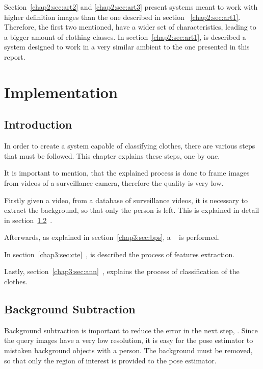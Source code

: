 \documentclass[titlepage,12pt,a4paper,times]{book}
\begin{document}
Section~\ref{chap2:sec:art2} and \ref{chap2:sec:art3} present systems meant to
work with higher definition images than the one described in section
~\ref{chap2:sec:art1}. Therefore, the first two mentioned, have a wider set of
characteristics, leading to a bigger amount of clothing classes. In
section~\ref{chap2:sec:art1}, is described a system designed to work in a very
similar ambient to the one presented in this report.

\chapter{Implementation}
\label{chap:imp}

\section{Introduction}
\label{chap3:sec:intro}

In order to create a system capable of classifying clothes, there are various
steps that must be followed. This chapter explains these steps, one by one.

It is important to mention, that the explained process is done to frame images
from videos of a surveillance camera, therefore the quality is very low.

Firstly given a video, from a database of surveillance videos, it is necessary
to extract the background, so that only the person is left. This is explained
in detail in section~\ref{chap3:sec:bs}~.

Afterwards, as explained in section~\ref{chap3:sec:bps}, a
~\citep{8} is performed.

In section~\ref{chap3:sec:cte}~, is described the
process of features extraction.

Lastly, section~\ref{chap3:sec:ann}~, explains the
process of classification of the clothes.

\section{Background Subtraction}
\label{chap3:sec:bs}

Background subtraction is important to reduce the error in the next step,
. Since the query images have a very low resolution, it
is easy for the pose estimator to mistaken background objects with a person.
The background must be removed, so that only the region of interest is provided
to the pose estimator.
\end{document}
